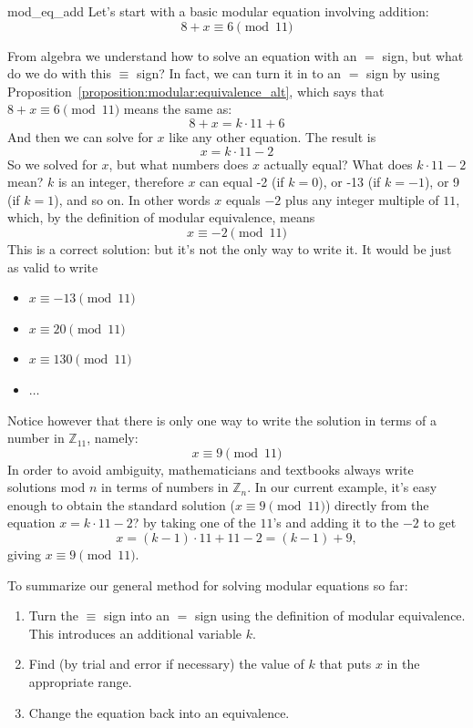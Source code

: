 \begin{example}{mod_eq_add}
Let's start with a basic modular equation involving addition: 
\[
8 + x \equiv 6 \pmod{11}
\]

From algebra we understand how to solve an equation with an $=$ sign, but what do we do with this $ \equiv $ sign?  In fact, we can turn it in to an $=$ sign by using Proposition~\ref{proposition:modular:equivalence_alt}, which says that $8 + x \equiv 6 \pmod{11}$ means the same as:
\[
8 + x = k \cdot 11 + 6
\]
And then we can solve for $x$ like any other equation.  The result is
\[
x = k \cdot 11 - 2
\]
So we solved for $x$, but  what numbers does $x$ actually equal?  What does $k \cdot 11 - 2$ mean?  $k$ is an integer, therefore $x$ can equal -2 (if $k = 0$), or -13 (if $k = -1$), or 9 (if $k = 1$), and so on.  In other words $x$ equals $-2$ plus any integer multiple of $11$, which, by the definition of modular equivalence, means
\[
x \equiv -2 \pmod{11}
\]
This is a correct solution: but it's not the only way to write it. It would be just as valid to write
\begin{itemize}
\item
$x \equiv -13 \pmod{11}$
\item
$x \equiv  20 \pmod{11}$
\item
$x \equiv  130 \pmod{11}$
\item
$\ldots$
\end{itemize}
Notice however that there is only one way to write the solution in terms of a number in ${\mathbb Z}_{11}$, namely:
\[
x \equiv 9 \pmod{11}
\]
In order to avoid ambiguity, mathematicians and textbooks always write solutions mod $n$ in terms of numbers in ${\mathbb Z}_n$. 
In our current example, it's easy enough to obtain the standard solution ($x \equiv 9 \pmod{11}$)  directly from the equation $x = k \cdot 11 - 2$? by taking
one of the $11$'s and adding it to the $-2$ to get
\[
x = (k-1) \cdot 11 + 11 - 2 = (k-1) + 9,
\]
giving  $x \equiv 9 \pmod{11}$.

\end{example}

\medskip

\noindent
To summarize our general method for solving modular equations so far:

\begin{enumerate}
\item
Turn the $ \equiv $ sign into an $=$ sign using the definition of modular equivalence. This introduces an additional variable $k$.
\item
Find (by trial and error if necessary) the value of $k$ that puts $x$ in the appropriate range.
\item
Change the equation back into an equivalence.
\end{enumerate}


